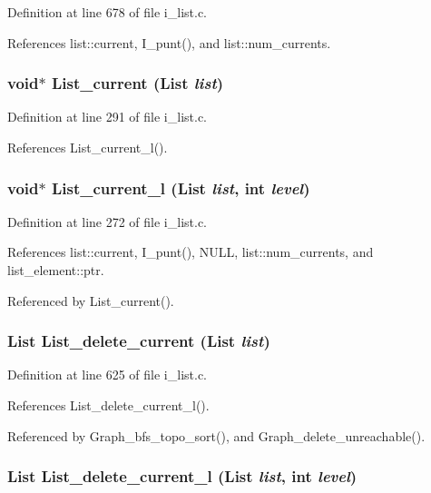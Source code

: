 Definition at line 678 of file i\_\-list.c.

References list::current, I\_\-punt(), and list::num\_\-currents.
\subsubsection{\setlength{\rightskip}{0pt plus 5cm}void$\ast$ List\_\-current (\bf{List} {\em list})}\label{i__list_8h_6b32c12844259ec9bf14b852d0d12e75}




Definition at line 291 of file i\_\-list.c.

References List\_\-current\_\-l().
\subsubsection{\setlength{\rightskip}{0pt plus 5cm}void$\ast$ List\_\-current\_\-l (\bf{List} {\em list}, int {\em level})}\label{i__list_8h_07e4dfebd091ecc901b9a30fc7d618ed}




Definition at line 272 of file i\_\-list.c.

References list::current, I\_\-punt(), NULL, list::num\_\-currents, and list\_\-element::ptr.

Referenced by List\_\-current().
\subsubsection{\setlength{\rightskip}{0pt plus 5cm}\bf{List} List\_\-delete\_\-current (\bf{List} {\em list})}\label{i__list_8h_9247c179897f302ce524ab9ac32801f2}




Definition at line 625 of file i\_\-list.c.

References List\_\-delete\_\-current\_\-l().

Referenced by Graph\_\-bfs\_\-topo\_\-sort(), and Graph\_\-delete\_\-unreachable().
\subsubsection{\setlength{\rightskip}{0pt plus 5cm}\bf{List} List\_\-delete\_\-current\_\-l (\bf{List} {\em list}, int {\em level})}\label{i__list_8h_a4c4cb63b882db1dbef81de56b65f194}




